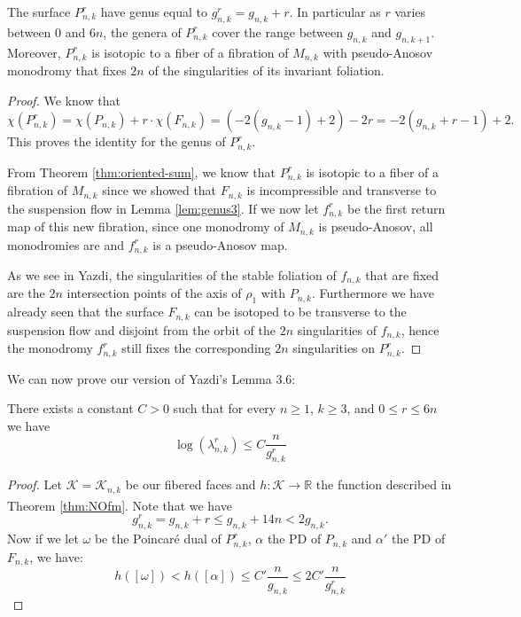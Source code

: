\begin{lem}
The surface $P^r_{n,k}$ have genus equal to $g^r_{n,k} = g_{n,k} + r$. In particular as $r$ varies between $0$ and $6n$, the genera of $P^r_{n,k}$ cover the range between $g_{n,k}$ and $g_{n,k+1}$. Moreover, $P^r_{n,k}$ is isotopic to a fiber of a fibration of $M_{n,k}$ with pseudo-Anosov monodromy that fixes $2n$ of the singularities of its invariant foliation.
\end{lem}

\begin{proof}
    We know that
    $$\chi(P^r_{n,k}) = \chi(P_{n,k}) + r\cdot\chi(F_{n,k}) = (-2(g_{n,k} - 1) + 2)-2r = -2(g_{n,k} + r - 1) + 2.$$ This proves the identity for the genus of $P^r_{n,k}.$

    From Theorem \ref{thm:oriented-sum}, we know that $P^r_{n,k}$ is isotopic to a fiber of a fibration of $M_{n,k}$ since we showed that $F_{n,k}$ is incompressible and transverse to the suspension flow in Lemma \ref{lem:genus3}. If we now let $f^r_{n,k}$ be the first return map of this new fibration, since one monodromy of $M_{n,k}$ is pseudo-Anosov, all monodromies are and $f^r_{n,k}$ is a pseudo-Anosov map.

    As we see in Yazdi, the singularities of the stable foliation of $f_{n,k}$ that are fixed are the $2n$ intersection points of the axis of $\rho_1$ with $P_{n,k}$. Furthermore we have already seen that the surface $F_{n,k}$ can be isotoped to be transverse to the suspension flow and disjoint from the orbit of the $2n$ singularities of $f_{n,k}$, hence the monodromy $f^r_{n,k}$ still fixes the corresponding $2n$ singularities on $P^r_{n,k}$.
\end{proof}

We can now prove our version of Yazdi's Lemma 3.6:

\begin{lem}
\label{lem:bound}
There exists a constant $C > 0$ such that for every $n \geq 1$, $k \geq 3$, and $0 \leq r \leq 6n$ we have $$\log(\lambda^r_{n,k}) \leq C\frac{n}{g^r_{n,k}}$$
\end{lem}
\begin{proof}
    Let $\mathcal{K} = \mathcal{K}_{n,k}$ be our fibered faces and $h: \mathcal{K} \xrightarrow[]{} \mathbb{R}$ the function described in Theorem \ref{thm:NOfm}. Note that we have
    $$g^r_{n,k} = g_{n,k} + r \leq g_{n,k} + 14n < 2g_{n,k}.$$
    Now if we let $\omega$ be the Poincar\'e dual of $P^r_{n,k}$, $\alpha$ the PD of $P_{n,k}$ and $\alpha'$ the PD of $F_{n,k}$, we have:
    $$h([\omega]) < h([\alpha]) \leq C'\frac{n}{g_{n,k}} \leq 2C'\frac{n}{g^r_{n,k}} $$
\end{proof}

